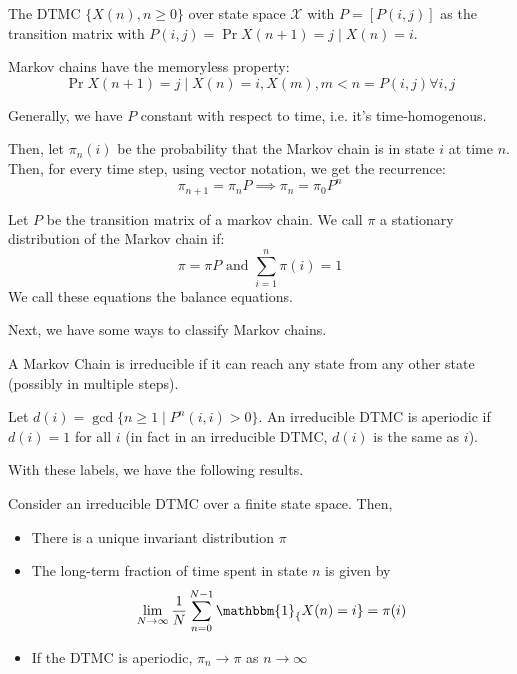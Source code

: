 \begin{definition}
    The DTMC $\{X(n), n \geq 0\}$ over state space $\mathcal{X}$ with $P = [P(i,j)]$ as the transition matrix
    with $P(i, j) = \Pr{X(n + 1) = j \mid X(n) = i}$.

    Markov chains have the memoryless property:
    \[\Pr{X(n + 1) = j \mid X(n) = i, X(m), m < n} = P(i, j) \forall i, j \]
\end{definition}

Generally, we have $P$ constant with respect to time, i.e. it's time-homogenous.

Then, let $\pi_n(i)$ be the probability that the
Markov chain is in state $i$ at time $n$. Then, for every time step,
using vector notation, we get the recurrence:
\[ \pi_{n + 1} = \pi_n P \implies \pi_n = \pi_0 P^n \]

\begin{definition}
    Let $P$ be the transition matrix of a markov chain. We call $\pi$ a stationary distribution
    of the Markov chain if:
    \[\pi = \pi P \text{ and } \sum_{i = 1}^n \pi(i) = 1\]
    We call these equations the balance equations.
\end{definition}

Next, we have some ways to classify Markov chains.

\begin{definition}[Irreducible]
    A Markov Chain is irreducible if it can reach any state from any other state (possibly in multiple steps).
\end{definition}

\begin{definition}[Aperiodic]
    Let $d(i) = \gcd\{n \geq 1 \mid P^n(i, i) > 0\}$. An irreducible DTMC is aperiodic if $d(i) = 1$ for all $i$
    (in fact in an irreducible DTMC, $d(i)$ is the same as $i$).
\end{definition}

With these labels, we have the following results.

\begin{theorem} 
    Consider an irreducible DTMC over a finite state space. Then,
    \begin{itemize}
        \item There is a unique invariant distribution $\pi$
        \item The long-term fraction of time spent in state $n$ is given by
        \[ \lim_{N \to \infty} \frac{1}{N} \sum_{n = 0}^{N - 1} \mathbbm{1}_\{X(n) = i\} = \pi(i) \]
        \item If the DTMC is aperiodic, $\pi_n \to \pi$ as $n \to \infty$
    \end{itemize}
\end{theorem}